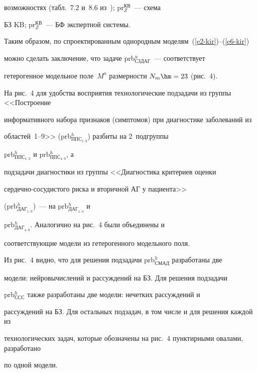 возможностях (табл.~7.2 и~8.6 из~\cite{9-kir}); pr$_Z^{\mathrm{КВ}}$~--- схема


БЗ KB; pr$_Z^{\mathrm{КВ}}$~--- БФ экспертной системы.





 Таким образом, по спроектированным однородным моделям~(\ref{e2-kir})--(\ref{e6-kir})


можно сделать заключение, что задаче prb$^u_{\mathrm{СЗДАГ}}$~--- соответствует


гетерогенное модельное поле~$M^a$ размерности $N_m\hm=23$ (рис.~4).





 На рис.~4 для удобства восприятия технологические подзадачи из группы <<Построение


информативного набора признаков (симптомов) при диагностике заболеваний из


 областей~1--9>> (prb$^h_{\mathrm{ППС}_{1\mbox{--}9}}$) разбиты на 2~подгруппы


prb$^h_{\mathrm{ППС}_{1\mbox{--}3}}$ и prb$^h_{\mathrm{ППС}_{4\mbox{--}9}}$, а


подзадачи диагностики из группы <<Диагностика критериев оценки


 сер\-деч\-но-со\-су\-ди\-сто\-го риска и вторичной АГ у пациента>>


(prb$^h_{\mathrm{ДАГ}_{1\mbox{--}9}}$)~--- на prb$^h_{\mathrm{ДАГ}_{1\mbox{--}3}}$ и


prb$^h_{\mathrm{ДАГ}_{4\mbox{--}9}}$. Аналогично на рис.~4 были объединены и


соответ\-ст\-ву\-ющие модели из гетерогенного модельного поля.





 Из рис.~4 видно, что для решения подзадачи prb$^h_{\mathrm{СМАД}}$ разработаны две


модели: нейровычислений и рассуждений на БЗ. Для решения подзадачи


prb$^h_{\mathrm{ССС}}$ также разработаны две модели: нечетких рассуждений и


рассуждений на БЗ. Для остальных подзадач, в том числе и для решения каждой из


технологических задач, которые обозначены на рис.~4 пунктирными овалами, разработано


по одной модели.





